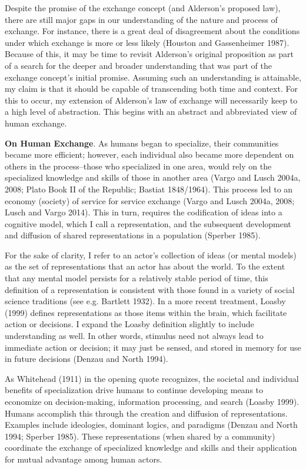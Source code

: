 Despite the promise of the exchange concept (and Alderson's proposed law), there are still major gaps in our understanding of the nature and process of exchange. For instance, there is a great deal of disagreement about the conditions under which exchange is more or less likely (Houston and Gassenheimer 1987). Because of this, it may be time to revisit Alderson's original proposition as part of a search for the deeper and broader understanding that was part of the exchange concept's initial promise. Assuming such an understanding is attainable, my claim is that it should be capable of transcending both time and context. For this to occur, my extension of Alderson's law of exchange will necessarily keep to a high level of abstraction. This begins with an abstract and abbreviated view of human exchange. 

\textbf{On Human Exchange}.
As humans began to specialize, their communities became more efficient; however, each individual also became more dependent on others in the process--those who specialized in one area, would rely on the specialized knowledge and skills of those in another area (Vargo and Lusch 2004a, 2008; Plato Book II of the Republic; Bastiat 1848/1964). This process led to an economy (society) of service for service exchange (Vargo and Lusch 2004a, 2008; Lusch and Vargo 2014). This in turn, requires the codification of ideas into a cognitive model, which I call a representation, and the subsequent development and diffusion of shared representations in a population (Sperber 1985). 

For the sake of clarity, I refer to an actor's collection of ideas (or mental models) as the set of representations that an actor has about the world. To the extent that any mental model persists for a relatively stable period of time, this definition of a representation is consistent with those found in a variety of social science traditions (see e.g. Bartlett 1932). In a more recent treatment, Loasby (1999) defines representations as those items within the brain, which facilitate action or decisions. I expand the Loasby definition slightly to include understanding as well. In other words, stimulus need not always lead to immediate action or decision; it may just be sensed, and stored in memory for use in future decisions (Denzau and North 1994). 

As Whitehead (1911) in the opening quote recognizes, the societal and individual benefits of specialization drive humans to continue developing means to economize on decision-making, information processing, and search (Loasby 1999). Humans accomplish this through the creation and diffusion of representations. Examples include ideologies, dominant logics, and paradigms (Denzau and North 1994; Sperber 1985). These representations (when shared by a community) coordinate the exchange of specialized knowledge and skills and their application for mutual advantage among human actors. 

